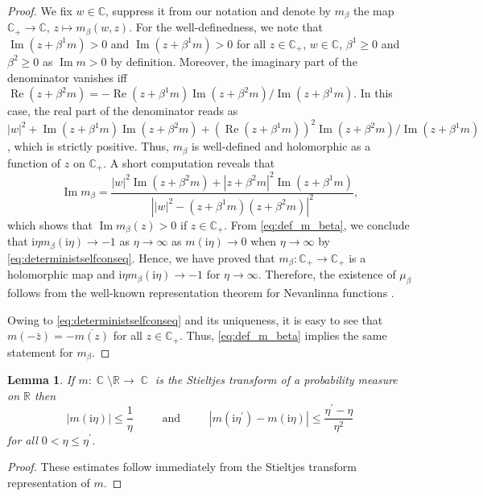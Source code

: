 \documentclass[11pt]{article}
\DeclareMathOperator{\Ima}{Im}
\DeclareMathOperator{\CC}{\mathbb{C}}
\newcommand{\ii}{\mathrm{i}}
\newcommand{\abs}[1]{\left| #1 \right|}
\newcommand{\R}{\mathbb{R}}
\newcommand{\C}{\mathbb{C}}
\DeclareMathOperator{\re}{Re}
\newcommand{\im}{\Ima}
\theoremstyle{plain}
\newtheorem{lemma}{Lemma}[section]
\theoremstyle{remark}
\numberwithin{equation}{section}
\newcommand*\barr[1]{\overline{#1}}
\begin{document}
	\begin{proof} 
		We fix $w \in \C$, suppress it from our notation and denote by $m_\beta$ the map $\C_+ \to \C$, $z \mapsto m_\beta(w,z)$.
		For the well-definedness, we note that $\im (z + \beta^1m ) >0$ and $\im (z + \beta^1m ) >0$ for all $z \in \C_+$, $w \in \C$, $\beta^1 \geq 0$ and $\beta^2 \geq 0$ as $\im m >0$ by definition. 
		Moreover, the imaginary part of the denominator vanishes iff $\re(z + \beta^2m) = - \re (z + \beta^1m)\im(z + \beta^2m)/\im (z + \beta^1 m)$. In this case, 
		the real part of the denominator reads as $\abs{w}^2 + \im(z + \beta^1 m) \im (z+ \beta^2m ) + (\re (z + \beta^1 m))^2 \im (z + \beta^2 m)/\im(z + \beta^1 m)$, which is strictly positive. 
		Thus, $m_\beta$ is well-defined and holomorphic as a function of $z$ on $\C_+$. 
		A short computation reveals that 
		\[ \im m_\beta= \frac{\abs{w}^2 \im(z + \beta^2 m) + \abs{z + \beta^2m}^2 \im (z + \beta^1 m)}{\abs{\abs{w}^2 - (z+ \beta^1m) (z + \beta^2m)}^2},  
		\]
		which shows that $\im m_\beta(z) >0$ if $z \in \C_+$. From \eqref{eq:def_m_beta}, we conclude that $\ii \eta m_\beta(\ii \eta) \to -1$ as $\eta \to \infty$ as $m(\ii \eta) \to 0$ when $\eta \to \infty$ by \eqref{eq:deterministselfconseq}. 
		Hence, we have proved that $m_\beta \colon \C_+ \to \C_+$ is a holomorphic map and 
		$\ii \eta m_\beta(\ii \eta) \to -1$ for $\eta \to \infty$. 
		Therefore, the existence of $\mu_\beta$ follows from the well-known representation theorem for Nevanlinna functions \cite[Theorem 11.9]{Rudin1987Analysis}.
		
		
		Owing to \eqref{eq:deterministselfconseq} and its uniqueness, it is easy to see that $m(-\bar z) = - \barr{m(z)}$ for all $z \in \C_+$. Thus, \eqref{eq:def_m_beta} implies the same statement for $m_\beta$.
	\end{proof} 
	
	\begin{lemma}\label{lem:Stieltjes_proper}
		If $m: \CC\setminus \R \rightarrow \CC$ is the Stieltjes transform of a probability measure on $\R$ then
		\begin{equation*}
			|m(\ii \eta)| \le \frac{1}{\eta }~ 
			\qquad \text{ and } \qquad ~| m(\ii \eta^\prime ) - m(\ii \eta) | \le \frac{\eta^{\prime} -\eta}{\eta^2}
		\end{equation*}
		for all $0 < \eta \le \eta^{\prime}$. 
	\end{lemma}
	
	\begin{proof} 
		These estimates follow immediately from the Stieltjes transform representation of $m$.
	\end{proof} 
	
\end{document}
